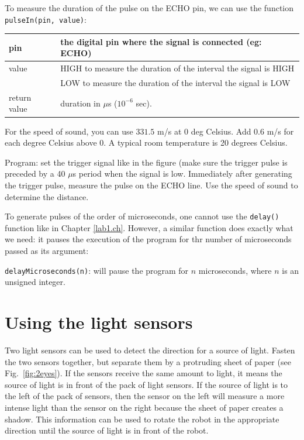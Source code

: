 \documentclass[12pt]{book}
\begin{document}
\begin{compactitem}[--]
\item To measure the duration of the pulse on the ECHO pin, we can use the
function \lstinline$pulseIn(pin, value)$:

\begin{tabular}{l | l}
  pin & the digital pin where the signal is connected (eg: ECHO) \\ \hline
  value & HIGH to measure the duration of the interval the signal is
  HIGH \\
  & LOW to measure the duration of the interval the signal is LOW
  \\ \hline
  return value & duration in $\mu$s ($10^{-6}$ sec). 
\end{tabular}

\item For the speed of sound, you can 
  use $331.5$ m/s at 0 deg Celsius. Add 0.6 m/s for each degree Celsius
  above 0. A typical room temperature is 20 degrees Celsius.

\item  Program: set the trigger signal like in the figure (make sure the
  trigger pulse is preceded by a 40 $\mu$s period when the signal is
  low. Immediately after generating the trigger pulse, measure the
  pulse on the ECHO line. Use the speed of sound to determine the
  distance.

\item  To generate pulses of the order of microseconds, one cannot use
  the \lstinline$delay()$ function like in Chapter
  \ref{lab1.ch}. However, a similar function does exactly what we
  need: it pauses the execution of the program for thr number of
  microseconds passed as its argument:

  \lstinline$delayMicroseconds(n)$: will pause the program for $n$
  microseconds, where $n$ is an unsigned integer.
\end{compactitem}

\section{Using the light sensors}

Two light sensors can be used to detect the direction for a source of
light.  Fasten the two sensors together, but separate them by a
protruding sheet of paper (see Fig.~\ref*{fig:2eyes}).  If the sensors
receive the same amount to light, it means the source of light is in
front of the pack of light sensors. If the source of light is to the
left of the pack of sensors, then the sensor on the left will measure
a more intense light than the sensor on the right because the sheet
of paper creates a shadow. This information can be used to rotate the
robot in the appropriate direction until the source of light is in
front of the robot.
\end{document}
